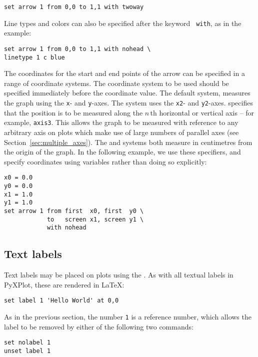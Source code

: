 \begin{verbatim}
set arrow 1 from 0,0 to 1,1 with twoway
\end{verbatim}

\noindent Line types and colors can also be specified after the keyword {\tt
with}, as in the example:

\begin{verbatim}
set arrow 1 from 0,0 to 1,1 with nohead \
linetype 1 c blue
\end{verbatim}

The coordinates for the start and end points of the arrow can be specified in a
range of coordinate systems. The coordinate system to be used should be
specified immediately before the coordinate value. The default system,
\indcot{first} measures the graph using the {\tt x}- and {\tt y}-axes. The
\indcot{second} system uses the {\tt x2}- and {\tt y2}-axes. 
specifies that the position is to be measured along the $n\,$th horizontal or
vertical axis -- for example, {\tt axis3}.\indcmd{set arrow} This allows the
graph to be measured with reference to any arbitrary axis on plots which make
use of large numbers of parallel axes (see Section~\ref{sec:multiple_axes}).
The \indcot{page} and \indcot{graph} systems both measure in centimetres from
the origin of the graph. In the following example, we use these specifiers, and
specify coordinates using variables rather than doing so explicitly:

\begin{verbatim}
x0 = 0.0
y0 = 0.0
x1 = 1.0
y1 = 1.0
set arrow 1 from first  x0, first  y0 \
            to   screen x1, screen y1 \
            with nohead
\end{verbatim}

\subsection{Text labels}

Text labels may be placed on plots using the . As with all
textual labels in PyXPlot, these are rendered in \LaTeX:

\begin{verbatim}
set label 1 'Hello World' at 0,0
\end{verbatim}

As in the previous section, the number {\tt 1} is a reference number, which
allows the label to be removed by either of the following two commands:

\begin{verbatim}
set nolabel 1
unset label 1
\end{verbatim}

